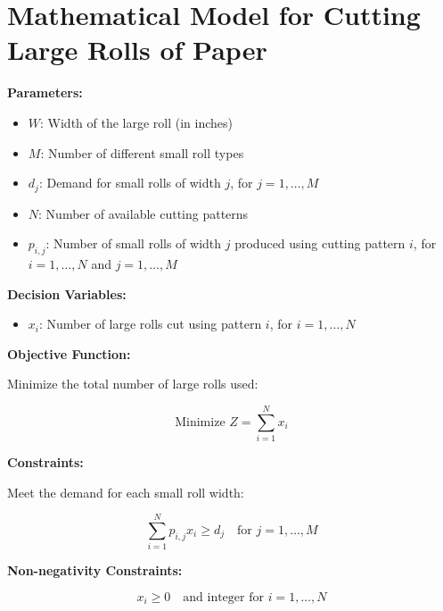 \documentclass{article}
\begin{document}
\section*{Mathematical Model for Cutting Large Rolls of Paper}

\textbf{Parameters:} 

\begin{itemize}
    \item $W$: Width of the large roll (in inches)
    \item $M$: Number of different small roll types
    \item $d_j$: Demand for small rolls of width $j$, for $j = 1, \ldots, M$
    \item $N$: Number of available cutting patterns
    \item $p_{i,j}$: Number of small rolls of width $j$ produced using cutting pattern $i$, for $i = 1, \ldots, N$ and $j = 1, \ldots, M$
\end{itemize}

\textbf{Decision Variables:} 

\begin{itemize}
    \item $x_i$: Number of large rolls cut using pattern $i$, for $i = 1, \ldots, N$
\end{itemize}

\textbf{Objective Function:} 

Minimize the total number of large rolls used:

\[
\text{Minimize } Z = \sum_{i=1}^{N} x_i
\]

\textbf{Constraints:} 

Meet the demand for each small roll width:

\[
\sum_{i=1}^{N} p_{i,j} x_i \geq d_j \quad \text{for } j = 1, \ldots, M
\]

\textbf{Non-negativity Constraints:} 

\[
x_i \geq 0 \quad \text{and integer for } i = 1, \ldots, N
\]
\end{document}
